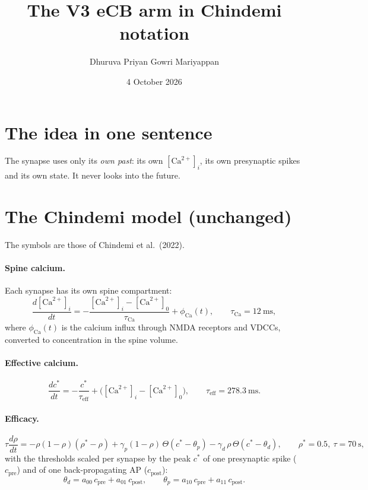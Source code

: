 \documentclass[11pt]{article}
\title{The V3 eCB arm in Chindemi notation}
\author{Dhuruva Priyan Gowri Mariyappan}
\date{4 October 2026}
\newcommand{\Ca}{[\mathrm{Ca}^{2+}]_i}
\newcommand{\Caz}{[\mathrm{Ca}^{2+}]_0}
\newcommand{\cpre}{c_{\mathrm{pre}}}
\newcommand{\cpost}{c_{\mathrm{post}}}
\newcommand{\phiCa}{\phi_{\mathrm{Ca}}}
\begin{document}
\maketitle

\section{The idea in one sentence}
\begin{center}
\end{center}
The synapse uses only its \emph{own past}: its own $\Ca$, its own presynaptic spikes and its own state. It never
looks into the future.

\section{The Chindemi model (unchanged)}
The symbols are those of Chindemi et al.\ (2022).

\paragraph{Spine calcium.} Each synapse has its own spine compartment:
\begin{equation}
\frac{d\Ca}{dt}=-\frac{\Ca-\Caz}{\tau_{\mathrm{Ca}}}+\phiCa(t),\qquad \tau_{\mathrm{Ca}}=12~\text{ms},
\label{eq:ca}
\end{equation}
where $\phiCa(t)$ is the calcium influx through NMDA receptors and VDCCs, converted to concentration in the spine
volume.

\paragraph{Effective calcium.}
\begin{equation}
\frac{dc^*}{dt}=-\frac{c^*}{\tau_{\mathrm{eff}}}+\bigl(\Ca-\Caz\bigr),\qquad \tau_{\mathrm{eff}}=278.3~\text{ms}.
\end{equation}

\paragraph{Efficacy.}
\begin{equation}
\tau\frac{d\rho}{dt}=-\rho(1-\rho)(\rho^*-\rho)+\gamma_p(1-\rho)\,\Theta(c^*-\theta_p)-\gamma_d\,\rho\,\Theta(c^*-\theta_d),
\qquad \rho^*=0.5,\ \tau=70~\text{s},
\end{equation}
with the thresholds scaled per synapse by the peak $c^*$ of one presynaptic spike ($\cpre$) and of one
back-propagating AP ($\cpost$):
\begin{equation}
\theta_d=a_{00}\,\cpre+a_{01}\,\cpost,\qquad \theta_p=a_{10}\,\cpre+a_{11}\,\cpost .
\end{equation}
\end{document}

